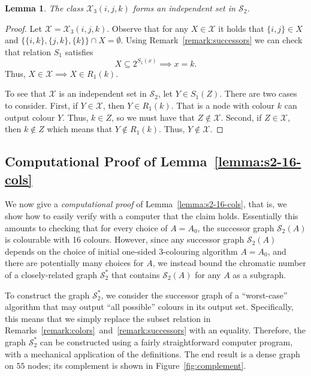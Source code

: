 \documentclass[a4paper,11pt]{article}
\newtheorem{lemma}[theorem]{Lemma}
\theoremstyle{remark}
\newcommand{\cS}{\mathcal{S}}
\begin{document}
\begin{lemma}
 The class $\mathcal{X}_3(i,j,k)$ forms an independent set in $\cS_2$.
\end{lemma}
\begin{proof}
 Let $\mathcal{X} = \mathcal{X}_3(i,j,k)$. Observe that for any $X \in \mathcal{X}$ it holds that $\{i,j\} \in X$ and $\big\{ \{i,k\}, \{j,k\}, \{k\} \big\} \cap X = \emptyset$. Using Remark~\ref{remark:successors} we can check that relation $S_1$ satisfies
\[
 X \subseteq 2^{S_1(x)} \implies x = k.
\]
Thus, $X \in \mathcal{X} \implies X \in R_1(k)$. 

To see that $\mathcal{X}$ is an independent set in $\cS_2$, let $Y \in S_1(Z)$. There are two cases to consider. First, if $Y \in \mathcal{X}$, then $Y \in R_1(k)$. That is a node with colour $k$ can output colour $Y$. Thus, $k \in Z$, so we must have that $Z \notin \mathcal{X}$. Second, if $Z \in \mathcal{X}$, then $k \notin Z$ which means that $Y \notin R_1(k)$. Thus, $Y \notin \mathcal{X}$.
\end{proof}


\subsection{Computational Proof of Lemma~\ref{lemma:s2-16-cols}}\label{sec:computer-proof}

We now give a \emph{computational proof} of Lemma~\ref{lemma:s2-16-cols}, that is, we show how to easily verify with a computer that the claim holds. Essentially this amounts to checking that for every choice of $A=A_0$, the successor graph $\cS_2(A)$ is colourable with 16 colours. However, since any successor graph $\cS_2(A)$ depends on the choice of initial one-sided 3-colouring algorithm $A = A_0$, and there are potentially many choices for $A$, we instead bound the chromatic number of a closely-related graph $\cS_2^*$ that contains $\cS_2(A)$ for any $A$ as a subgraph. 

To construct the graph $\cS_2^*$, we consider the successor graph of a ``worst-case'' algorithm that may output ``all possible'' colours in its output set. Specifically, this means that we simply replace the subset relation in Remarks~\ref{remark:colors}~and~\ref{remark:successors} with an equality. Therefore, the graph $\cS_2^*$ can be constructed using a fairly straightforward computer program, with a mechanical application of the definitions. The end result is a dense graph on $55$ nodes; its complement is shown in Figure~\ref{fig:complement}. 
\end{document}
